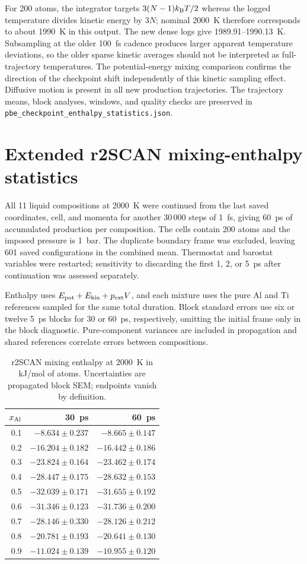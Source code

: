\documentclass[10pt]{article}
\begin{document}
For 200 atoms, the integrator targets $3(N-1)k_{\rm B}T/2$ whereas the logged temperature divides kinetic energy by $3N$; nominal 2000~K therefore corresponds to about 1990~K in this output. The new dense logs give 1989.91--1990.13~K. Subsampling at the older 100~fs cadence produces larger apparent temperature deviations, so the older sparse kinetic averages should not be interpreted as full-trajectory temperatures. The potential-energy mixing comparison confirms the direction of the checkpoint shift independently of this kinetic sampling effect. Diffusive motion is present in all new production trajectories. The trajectory means, block analyses, windows, and quality checks are preserved in \texttt{pbe\_checkpoint\_enthalpy\_statistics.json}.


\section{Extended r2SCAN mixing-enthalpy statistics}
All 11 liquid compositions at 2000~K were continued from the last saved coordinates, cell, and momenta for another 30\,000 steps of 1~fs, giving 60~ps of accumulated production per composition. The cells contain 200 atoms and the imposed pressure is 1~bar. The duplicate boundary frame was excluded, leaving 601 saved configurations in the combined mean. Thermostat and barostat variables were restarted; sensitivity to discarding the first 1, 2, or 5~ps after continuation was assessed separately.

Enthalpy uses $E_{\rm pot}+E_{\rm kin}+p_{\rm ext}V$, and each mixture uses the pure Al and Ti references sampled for the same total duration. Block standard errors use six or twelve 5~ps blocks for 30 or 60~ps, respectively, omitting the initial frame only in the block diagnostic. Pure-component variances are included in propagation and shared references correlate errors between compositions.

\begin{table}[htbp]
\centering
\caption{r2SCAN mixing enthalpy at 2000~K in kJ/mol of atoms. Uncertainties are propagated block SEM; endpoints vanish by definition.}
\label{tab:scan60}
\begin{tabular}{rrr}
\toprule
$x_{\rm Al}$ & 30~ps & 60~ps\\
\midrule
0.1 & $-8.634\pm0.237$ & $-8.665\pm0.147$ \\
0.2 & $-16.204\pm0.182$ & $-16.442\pm0.186$ \\
0.3 & $-23.824\pm0.164$ & $-23.462\pm0.174$ \\
0.4 & $-28.447\pm0.175$ & $-28.632\pm0.153$ \\
0.5 & $-32.039\pm0.171$ & $-31.655\pm0.192$ \\
0.6 & $-31.346\pm0.123$ & $-31.736\pm0.200$ \\
0.7 & $-28.146\pm0.330$ & $-28.126\pm0.212$ \\
0.8 & $-20.781\pm0.193$ & $-20.641\pm0.130$ \\
0.9 & $-11.024\pm0.139$ & $-10.955\pm0.120$ \\
\bottomrule
\end{tabular}
\end{table}
\end{document}
